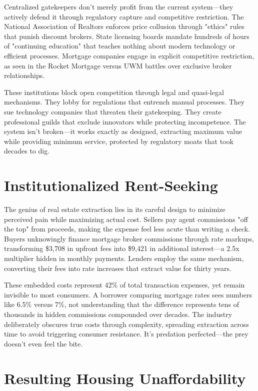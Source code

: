 Centralized gatekeepers don't merely profit from the current system—they actively defend it through regulatory capture and competitive restriction. The National Association of Realtors enforces price collusion through "ethics" rules that punish discount brokers. State licensing boards mandate hundreds of hours of "continuing education" that teaches nothing about modern technology or efficient processes. Mortgage companies engage in explicit competitive restriction, as seen in the Rocket Mortgage versus UWM battles over exclusive broker relationships.

These institutions block open competition through legal and quasi-legal mechanisms. They lobby for regulations that entrench manual processes. They sue technology companies that threaten their gatekeeping. They create professional guilds that exclude innovators while protecting incompetence. The system isn't broken—it works exactly as designed, extracting maximum value while providing minimum service, protected by regulatory moats that took decades to dig.

\section{Institutionalized Rent-Seeking}

The genius of real estate extraction lies in its careful design to minimize perceived pain while maximizing actual cost. Sellers pay agent commissions "off the top" from proceeds, making the expense feel less acute than writing a check. Buyers unknowingly finance mortgage broker commissions through rate markups, transforming \$3,708 in upfront fees into \$9,421 in additional interest—a 2.5x multiplier hidden in monthly payments. Lenders employ the same mechanism, converting their fees into rate increases that extract value for thirty years.

These embedded costs represent 42\% of total transaction expenses, yet remain invisible to most consumers. A borrower comparing mortgage rates sees numbers like 6.5\% versus 7\%, not understanding that the difference represents tens of thousands in hidden commissions compounded over decades. The industry deliberately obscures true costs through complexity, spreading extraction across time to avoid triggering consumer resistance. It's predation perfected—the prey doesn't even feel the bite.

\section{Resulting Housing Unaffordability}

